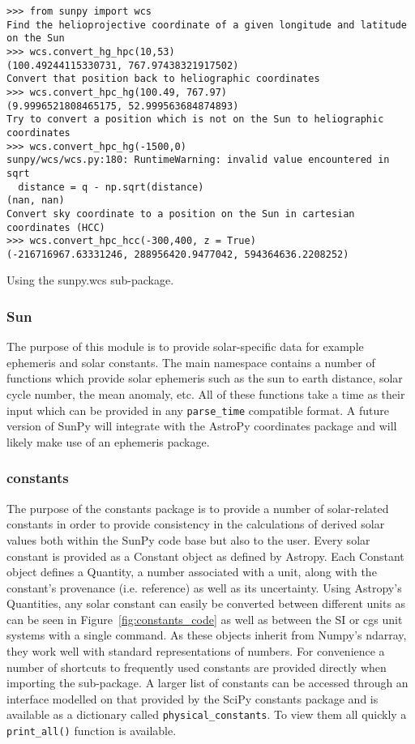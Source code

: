 \begin{listing}[H]
\begin{verbatim}
>>> from sunpy import wcs
Find the helioprojective coordinate of a given longitude and latitude on the Sun
>>> wcs.convert_hg_hpc(10,53)
(100.49244115330731, 767.97438321917502)
Convert that position back to heliographic coordinates
>>> wcs.convert_hpc_hg(100.49, 767.97)
(9.9996521808465175, 52.999563684874893)
Try to convert a position which is not on the Sun to heliographic coordinates
>>> wcs.convert_hpc_hg(-1500,0)
sunpy/wcs/wcs.py:180: RuntimeWarning: invalid value encountered in sqrt
  distance = q - np.sqrt(distance)
(nan, nan)
Convert sky coordinate to a position on the Sun in cartesian coordinates (HCC)
>>> wcs.convert_hpc_hcc(-300,400, z = True)
(-216716967.63331246, 288956420.9477042, 594364636.2208252)
\end{verbatim}
\caption{Using the sunpy.wcs sub-package.}
\label{code:wcs_code}
\end{listing}

\subsubsection{Sun}
The purpose of this module is to provide solar-specific data for example ephemeris and
solar constants. The main namespace contains a number of functions which provide solar
ephemeris such as the sun to earth distance, solar cycle number, the mean anomaly, etc.
All of these functions take a time as their input which can be provided in any 
\texttt{parse\_time}
compatible format. 
A future version of SunPy will integrate with the AstroPy coordinates package and will 
likely make use of an ephemeris package.

\subsubsection{constants}
The purpose of the constants package is to provide a number of solar-related 
constants in order to provide consistency in the calculations of derived solar 
values both within the SunPy code base but also to the user. Every solar 
constant is provided as a Constant object as defined by Astropy. Each 
Constant object defines a Quantity, a number associated with a unit, along with 
the constant's provenance (i.e. reference) as well as its uncertainty. Using 
Astropy's Quantities, any solar constant can easily be converted between 
different units as can be seen in Figure~\ref{fig:constants_code} as well
as between the SI or cgs unit systems with a single command.  As these objects inherit from 
Numpy's ndarray, they work well with standard representations of numbers.
For convenience a number of shortcuts to frequently used constants are provided 
directly when importing the sub-package. A larger list of constants can be 
accessed through an interface modelled on that provided by the SciPy constants 
package and is available as a dictionary called \texttt{physical\_constants}. 
To view them all quickly a \texttt{print\_all()} function is available.

